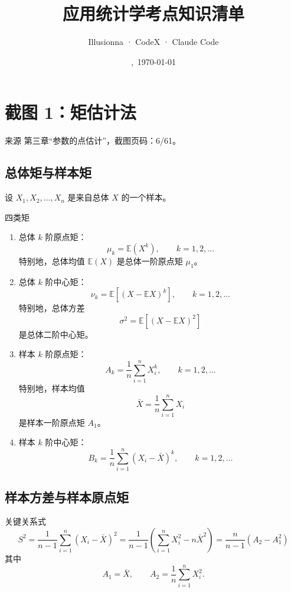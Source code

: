 \documentclass[UTF8,zihao=-4,fontset=fandol]{ctexart}
\title{\textbf{应用统计学考点知识清单}}
\author{Illusionna · CodeX · Claude Code}
\date{\currenttime,\ \today}
\newcommand{\E}{\mathbb{E}}
\begin{document}
\maketitle
\tableofcontents
\newpage

\section{截图 1：矩估计法}

\begin{sourcebox}{来源}
第三章“参数的点估计”，截图页码：6/61。
\end{sourcebox}

\subsection{总体矩与样本矩}

设 $X_1,X_2,\ldots,X_n$ 是来自总体 $X$ 的一个样本。

\begin{keybox}{四类矩}
\begin{enumerate}
  \item 总体 $k$ 阶原点矩：
  \[
  \mu_k=\E(X^k),\qquad k=1,2,\ldots
  \]
  特别地，总体均值 $\E(X)$ 是总体一阶原点矩 $\mu_1$。

  \item 总体 $k$ 阶中心矩：
  \[
  \nu_k=\E[(X-\E X)^k],\qquad k=1,2,\ldots
  \]
  特别地，总体方差
  \[
  \sigma^2=\E[(X-\E X)^2]
  \]
  是总体二阶中心矩。

  \item 样本 $k$ 阶原点矩：
  \[
  A_k=\frac{1}{n}\sum_{i=1}^{n}X_i^k,\qquad k=1,2,\ldots
  \]
  特别地，样本均值
  \[
  \bar{X}=\frac{1}{n}\sum_{i=1}^{n}X_i
  \]
  是样本一阶原点矩 $A_1$。

  \item 样本 $k$ 阶中心矩：
  \[
  B_k=\frac{1}{n}\sum_{i=1}^{n}(X_i-\bar{X})^k,\qquad k=1,2,\ldots
  \]
\end{enumerate}
\end{keybox}

\subsection{样本方差与样本原点矩}

\begin{keybox}{关键关系式}
\[
S^2
=\frac{1}{n-1}\sum_{i=1}^{n}(X_i-\bar{X})^2
=\frac{1}{n-1}\left(\sum_{i=1}^{n}X_i^2-n\bar{X}^2\right)
=\frac{n}{n-1}(A_2-A_1^2)
\]
其中
\[
A_1=\bar{X},\qquad
A_2=\frac{1}{n}\sum_{i=1}^{n}X_i^2.
\]
\end{keybox}
\end{document}
